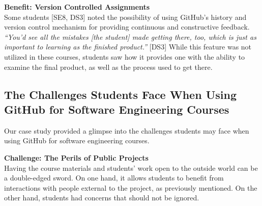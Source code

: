 \textbf{Benefit: Version Controlled Assignments}\\
%
Some students [SE8, DS3] noted the possibility of using GitHub's history and version control mechanism for providing continuous and constructive feedback. \textit{``You'd see all the mistakes [the student] made getting there, too, which is just as important to learning as the finished product.''} [DS3] While this feature was not utilized in these courses, students saw how it provides one with the ability to examine the final product, as well as the process used to get there.

\subsection{The Challenges Students Face When Using GitHub for Software Engineering Courses}
Our case study provided a glimpse into the challenges students may face when using GitHub for software engineering courses.

\textbf{Challenge: The Perils of Public Projects}\\
Having the course materials and students' work open to the outside world can be a double-edged sword. On one hand, it allows students to benefit from interactions with people external to the project, as previously mentioned. On the other hand, students had concerns that should not be ignored.

